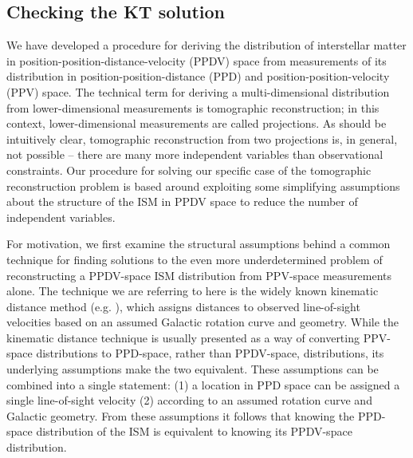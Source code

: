 \subsection{Checking the KT solution}
\label{sec:KT-validation}

We have developed a procedure for deriving the distribution of interstellar matter in position-position-distance-velocity (PPDV) space from measurements of its distribution in position-position-distance (PPD) and position-position-velocity (PPV) space. 
The technical term for deriving a multi-dimensional distribution from lower-dimensional measurements is tomographic reconstruction; in this context, lower-dimensional measurements are called projections. 
As should be intuitively clear, tomographic reconstruction from two projections is, in general, not possible -- there are many more independent variables than observational constraints. 
Our procedure for solving our specific case of the tomographic reconstruction problem is based around exploiting some simplifying assumptions about the structure of the ISM in PPDV space to reduce the number of independent variables.

For motivation, we first examine the structural assumptions behind a common technique for finding solutions to the even more underdetermined problem of reconstructing a PPDV-space ISM distribution from PPV-space measurements alone. 
The  technique we are referring to here is the widely known kinematic distance method (e.g. \citealt{Levine_2006}), which assigns distances to observed line-of-sight velocities based on an assumed Galactic rotation curve and geometry. 
While the kinematic distance technique is usually presented as a way of converting PPV-space distributions to PPD-space, rather than PPDV-space, distributions, its underlying assumptions make the two equivalent. 
These assumptions can be combined into a single statement: (1) a location in PPD space can be assigned a single line-of-sight velocity (2) according to an assumed rotation curve and Galactic geometry. 
From these assumptions it follows that knowing the PPD-space distribution of the ISM is equivalent to knowing its PPDV-space distribution. 


